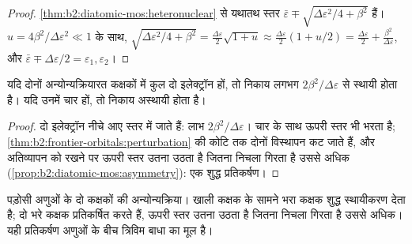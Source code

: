 \begin{proof}
\cref{thm:b2:diatomic-mos:heteronuclear} से यथातथ स्तर $\bar\varepsilon \mp
\sqrt{\Delta\varepsilon^2/4 + \beta^2}$ हैं। $u = 4\beta^2/\Delta\varepsilon^2 \ll 1$ के साथ, $\sqrt{\Delta\varepsilon^2/4
+ \beta^2} = \frac{\Delta\varepsilon}{2}\sqrt{1 + u} \approx \frac{\Delta\varepsilon}{2}(1 + u/2) =
\frac{\Delta\varepsilon}{2} + \frac{\beta^2}{\Delta\varepsilon}$, और $\bar\varepsilon \mp \Delta\varepsilon/2 = \varepsilon_1,
\varepsilon_2$।
\end{proof}

\begin{proposition}\label{prop:b2:frontier-orbitals:four-electron}
यदि दोनों अन्योन्यक्रियारत कक्षकों में कुल दो इलेक्ट्रॉन हों, तो निकाय लगभग
$2\beta^2/\Delta\varepsilon$ से स्थायी होता है। यदि उनमें चार हों, तो निकाय अस्थायी होता है।
\end{proposition}

\begin{proof}
दो इलेक्ट्रॉन नीचे आए स्तर में जाते हैं: लाभ $2\beta^2/\Delta\varepsilon$। चार के साथ ऊपरी स्तर
भी भरता है; \cref{thm:b2:frontier-orbitals:perturbation} की कोटि तक दोनों
विस्थापन कट जाते हैं, और अतिव्यापन को रखने पर ऊपरी स्तर उतना उठता है जितना निचला
गिरता है उससे अधिक (\cref{prop:b2:diatomic-mos:asymmetry}): एक शुद्ध प्रतिकर्षण।
\end{proof}

\begin{omfigure}

{\small पड़ोसी अणुओं के दो कक्षकों की अन्योन्यक्रिया। खाली कक्षक के सामने भरा
कक्षक शुद्ध स्थायीकरण देता है; दो भरे कक्षक प्रतिकर्षित करते हैं, ऊपरी
स्तर उतना उठता है जितना निचला गिरता है उससे अधिक। यही प्रतिकर्षण अणुओं के बीच
त्रिविम बाधा का मूल है।}
\end{omfigure}

